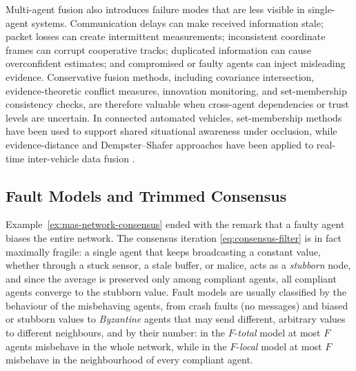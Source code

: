 \documentclass[graybox,envcountchap]{style/SNmono}
\begin{document}
Multi-agent fusion also introduces failure modes that are less visible in single-agent systems. Communication delays can make received information stale; packet losses can create intermittent measurements; inconsistent coordinate frames can corrupt cooperative tracks; duplicated information can cause overconfident estimates; and compromised or faulty agents can inject misleading evidence. Conservative fusion methods, including covariance intersection, evidence-theoretic conflict measures, innovation monitoring, and set-membership consistency checks, are therefore valuable when cross-agent dependencies or trust levels are uncertain. In connected automated vehicles, set-membership methods have been used to support shared situational awareness under occlusion, while evidence-distance and Dempster--Shafer approaches have been applied to real-time inter-vehicle data fusion \cite{narri2021_set_membership_shared_awareness,cho_realtime_2020}.

\subsection{Fault Models and Trimmed Consensus}
\label{subsec:mas-wmsr}

Example~\ref{ex:mas-network-consensus} ended with the remark that a faulty agent biases the entire network. The consensus iteration \eqref{eq:consensus-filter} is in fact maximally fragile: a single agent that keeps broadcasting a constant value, whether through a stuck sensor, a stale buffer, or malice, acts as a \emph{stubborn} node, and since the average is preserved only among compliant agents, all compliant agents converge to the stubborn value. Fault models are usually classified by the behaviour of the misbehaving agents, from crash faults (no messages) and biased or stubborn values to \emph{Byzantine} agents that may send different, arbitrary values to different neighbours, and by their number: in the $F$-\emph{total} model at most $F$ agents misbehave in the whole network, while in the $F$-\emph{local} model at most $F$ misbehave in the neighbourhood of every compliant agent.
\end{document}
